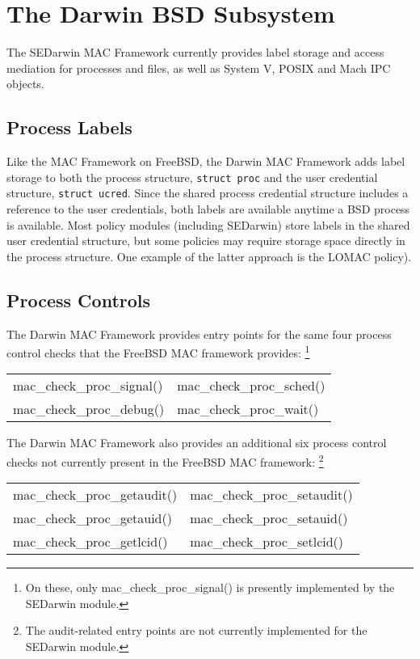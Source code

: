 \section{The Darwin BSD Subsystem}

The SEDarwin MAC Framework currently provides label storage and
access mediation for processes and files, as well as System V, POSIX
and Mach IPC objects.

\subsection{Process Labels}

Like the MAC Framework on FreeBSD, the Darwin MAC Framework adds label
storage to both the process structure, {\tt struct proc} and the user
credential structure, {\tt struct ucred}.  Since the shared process
credential structure includes a reference to the user credentials,
both labels are available anytime a BSD process is available.  Most
policy modules (including SEDarwin) store labels in the shared user
credential structure, but some policies may require storage space
directly in the process structure.  One example of the latter
approach is the LOMAC policy\cite{Fraser00,fraser01}).

\subsection{Process Controls}

The Darwin MAC Framework provides entry points for the same four process
control checks that the FreeBSD MAC framework provides:
\footnote{On these, only mac\_check\_proc\_signal() is presently
implemented by the SEDarwin module.}

\begin{center}
\begin{tabular}{ll}
mac\_check\_proc\_signal() & mac\_check\_proc\_sched() \\
mac\_check\_proc\_debug() & mac\_check\_proc\_wait() \\
\end{tabular}
\end{center}

The Darwin MAC Framework also provides an additional six process
control checks not currently present in the FreeBSD MAC framework:
\footnote{The audit-related entry points are not currently
implemented for the SEDarwin module.}

\begin{center}
\begin{tabular}{ll}
mac\_check\_proc\_getaudit() & mac\_check\_proc\_setaudit() \\
mac\_check\_proc\_getauid() & mac\_check\_proc\_setauid() \\
mac\_check\_proc\_getlcid() & mac\_check\_proc\_setlcid() \\
\end{tabular}
\end{center}

